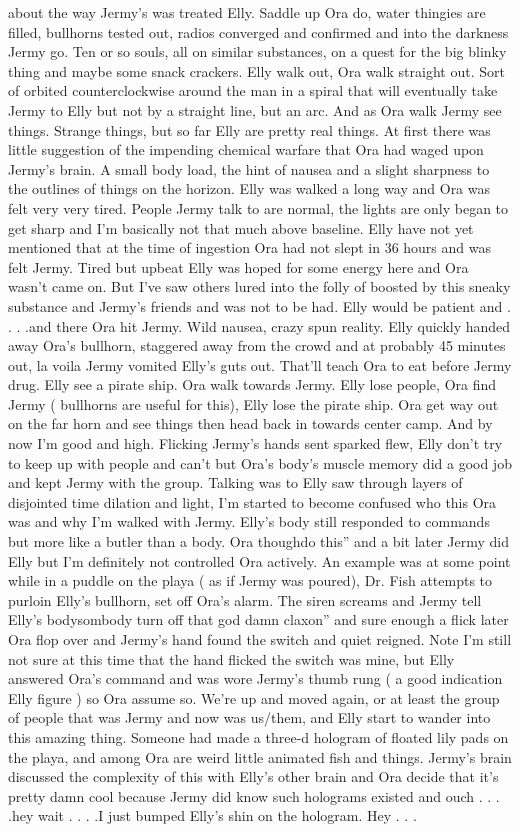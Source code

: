 \documentclass[12pt]{book}
\begin{document}
about the way Jermy's was treated Elly. Saddle up Ora do, water thingies are filled, bullhorns tested out, radios converged and confirmed and into the darkness Jermy go. Ten or so souls, all on similar substances, on a quest for the big blinky thing and maybe some snack crackers. Elly walk out, Ora walk straight out. Sort of orbited counterclockwise around the man in a spiral that will eventually take Jermy to Elly but not by a straight line, but an arc. And as Ora walk Jermy see things. Strange things, but so far Elly are pretty real things. At first there was little suggestion of the impending chemical warfare that Ora had waged upon Jermy's brain. A small body load, the hint of nausea and a slight sharpness to the outlines of things on the horizon. Elly was walked a long way and Ora was felt very very tired. People Jermy talk to are normal, the lights are only began to get sharp and I'm basically not that much above baseline. Elly have not yet mentioned that at the time of ingestion Ora had not slept in 36 hours and was felt Jermy. Tired but upbeat Elly was hoped for some energy here and Ora wasn't came on. But I've saw others lured into the folly of boosted by this sneaky substance and Jermy's friends and was not to be had. Elly would be patient and . . . .and there Ora hit Jermy. Wild nausea, crazy spun reality. Elly quickly handed away Ora's bullhorn, staggered away from the crowd and at probably 45 minutes out, la voila Jermy vomited Elly's guts out. That'll teach Ora to eat before Jermy drug. Elly see a pirate ship. Ora walk towards Jermy. Elly lose people, Ora find Jermy ( bullhorns are useful for this), Elly lose the pirate ship. Ora get way out on the far horn and see things then head back in towards center camp. And by now I'm good and high. Flicking Jermy's hands sent sparked flew, Elly don't try to keep up with people and can't but Ora's body's muscle memory did a good job and kept Jermy with the group. Talking was to Elly saw through layers of disjointed time dilation and light, I'm started to become confused who this Ora was and why I'm walked with Jermy. Elly's body still responded to commands but more like a butler than a body. Ora thoughdo this'' and a bit later Jermy did Elly but I'm definitely not controlled Ora actively. An example was at some point while in a puddle on the playa ( as if Jermy was poured), Dr. Fish attempts to purloin Elly's bullhorn, set off Ora's alarm. The siren screams and Jermy tell Elly's bodysombody turn off that god damn claxon'' and sure enough a flick later Ora flop over and Jermy's hand found the switch and quiet reigned. Note I'm still not sure at this time that the hand flicked the switch was mine, but Elly answered Ora's command and was wore Jermy's thumb rung ( a good indication Elly figure ) so Ora assume so. We're up and moved again, or at least the group of people that was Jermy and now was us/them, and Elly start to wander into this amazing thing. Someone had made a three-d hologram of floated lily pads on the playa, and among Ora are weird little animated fish and things. Jermy's brain discussed the complexity of this with Elly's other brain and Ora decide that it's pretty damn cool because Jermy did know such holograms existed and ouch . . . .hey wait . . . .I just bumped Elly's shin on the hologram. Hey . . . 
\end{document}
